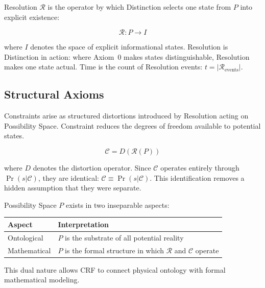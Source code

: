 \documentclass[12pt, a4paper]{article}
\begin{document}
\begin{formalbox}[title={Axiom 2: Resolution ($\mathcal{R}$)}]
Resolution $\mathcal{R}$ is the operator by which Distinction selects one state from
$P$ into explicit existence:

\[
  \mathcal{R} : P \longrightarrow I
\]

where $I$ denotes the space of explicit informational states. Resolution is Distinction
in action: where Axiom~0 makes states distinguishable, Resolution makes one state
actual. Time is the count of Resolution events: $t = |\mathcal{R}_{\mathrm{events}}|$.
\end{formalbox}

\subsection{Structural Axioms}

\begin{formalbox}[title={Axiom 3: Constraint ($\mathcal{C}$)}]
Constraints arise as structured distortions introduced by Resolution acting on
Possibility Space. Constraint reduces the degrees of freedom available to potential
states.

\[
  \mathcal{C} = D(\mathcal{R}(P))
\]

where $D$ denotes the distortion operator. Since $\mathcal{C}$ operates entirely
through $\Pr(s|\mathcal{C})$, they are identical: $\mathcal{C} \equiv \Pr(s|\mathcal{C})$.
This identification removes a hidden assumption that they were separate.
\end{formalbox}

\begin{formalbox}[title={Axiom 4: Dual Nature of $P$}]
Possibility Space $P$ exists in two inseparable aspects:
\begin{center}
\renewcommand{\arraystretch}{1.2}
\begin{tabular}{ll}
\toprule
\textbf{Aspect} & \textbf{Interpretation} \\
\midrule
Ontological & $P$ is the substrate of all potential reality \\
Mathematical & $P$ is the formal structure in which $\mathcal{R}$ and $\mathcal{C}$ operate \\
\bottomrule
\end{tabular}
\end{center}
This dual nature allows CRF to connect physical ontology with formal mathematical modeling.
\end{formalbox}
\end{document}
